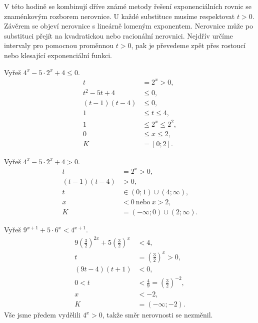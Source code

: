 \documentclass[11pt,a4paper]{article}
\begin{document}
V této hodině se kombinují dříve známé metody řešení exponenciálních rovnic se znaménkovým rozborem nerovnice. U každé substituce musíme respektovat $t>0$. Závěrem se objeví nerovnice s lineárně lomeným exponentem.
Nerovnice může po substituci přejít na kvadratickou nebo racionální nerovnici. Nejdřív určíme intervaly pro pomocnou proměnnou $t>0$, pak je převedeme zpět přes rostoucí nebo klesající exponenciální funkci.
\begin{prikladReseniBox}[title={Příklad 1}]
Vyřeš $4^x-5\cdot2^x+4\le0$.
\tcblower
\[
\begin{aligned}t&=2^x>0,\\t^2-5t+4&\le0,\\(t-1)(t-4)&\le0,\\1&\le t\le4,\\1&\le2^x\le2^2,\\0&\le x\le2,\\K&=[0;2].\end{aligned}
\]

\end{prikladReseniBox}
\begin{prikladReseniBox}[title={Příklad 2}]
Vyřeš $4^x-5\cdot2^x+4>0$.
\tcblower
\[
\begin{aligned}t&=2^x>0,\\(t-1)(t-4)&>0,\\t&\in(0;1)\cup(4;\infty),\\x&<0\ \text{nebo}\ x>2,\\K&=(-\infty;0)\cup(2;\infty).\end{aligned}
\]

\end{prikladReseniBox}
\begin{prikladReseniBox}[title={Příklad 3}]
Vyřeš $9^{x+1}+5\cdot6^x<4^{x+1}$.
\tcblower
\[
\begin{aligned}9\left(\frac32\right)^{2x}+5\left(\frac32\right)^x&<4,\\t&=\left(\frac32\right)^x>0,\\(9t-4)(t+1)&<0,\\0<t&<\frac49=\left(\frac32\right)^{-2},\\x&<-2,\\K&=(-\infty;-2).\end{aligned}
\]
Vše jsme předem vydělili $4^x>0$, takže směr nerovnosti se nezměnil.
\end{prikladReseniBox}
\end{document}
